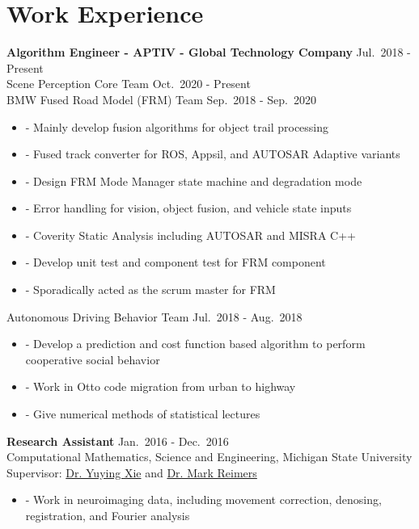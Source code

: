 \documentclass[a4paper,10pt,dvipdfmx]{article}
\begin{document}
\section*{Work Experience}
\indent \textbf{Algorithm Engineer - APTIV - Global Technology Company} \hfill Jul.~2018 - Present\\
\indent Scene Perception Core Team \hfill Oct.~2020 - Present\\
\indent BMW Fused Road Model (FRM) Team \hfill Sep.~2018 - Sep.~2020
\begin{itemize}[noitemsep,nolistsep]
  \item[] - Mainly develop fusion algorithms for object trail processing
  \item[] - Fused track converter for ROS, Appsil, and AUTOSAR Adaptive variants
  \item[] - Design FRM Mode Manager state machine and degradation mode
  \item[] - Error handling for vision, object fusion, and vehicle state inputs
  \item[] - Coverity Static Analysis including AUTOSAR and MISRA C++
  \item[] - Develop unit test and component test for FRM component
  \item[] - Sporadically acted as the scrum master for FRM
\end{itemize}

\indent Autonomous Driving Behavior Team \hfill Jul.~2018 - Aug.~2018
\begin{itemize}[noitemsep,nolistsep]
  \item[] - Develop a prediction and cost function based algorithm to perform cooperative social behavior
  \item[] - Work in Otto code migration from urban to highway
  \item[] - Give numerical methods of statistical lectures\\
\end{itemize}

\indent \textbf{Research Assistant} \hfill Jan.~2016 - Dec.~2016\\
\indent Computational Mathematics, Science and Engineering, Michigan State University\\
\indent Supervisor: \href{https://cmse.msu.edu/directory/faculty/yuying-xie/}{Dr. Yuying Xie} and \href{https://msu.edu/~reimersm/}{Dr. Mark Reimers}
\begin{itemize}[noitemsep,nolistsep]
  \item[] - Work in neuroimaging data, including movement correction, denosing, registration, and Fourier analysis\\
\end{itemize}
\end{document}
